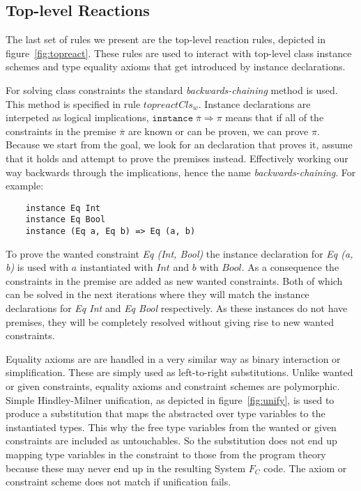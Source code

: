 \subsection{Top-level Reactions}
The last set of rules we present are the top-level reaction rules, depicted
in figure~\ref{fig:topreact}. These rules are used to interact with top-level
class instance schemes and type equality axioms that get introduced by instance
declarations.

For solving class constraints the standard \textit{backwards-chaining} method is
used. This method is specified in rule $topreactCls_w$. Instance declarations
are interpeted as logical implications, $\texttt{instance} \; \overline{\pi}
\Rightarrow \pi$ means that if all of the constraints in the premise
$\overline{\pi}$ are known or can be proven, we can prove $\pi$. Because we
start from the goal, we look for an declaration that proves it, assume that it
holds and attempt to prove the premises instead. Effectively working our way
backwards through the implications, hence the name \textit{backwards-chaining}.
For example:
\begin{verbatim}
    instance Eq Int
    instance Eq Bool
    instance (Eq a, Eq b) => Eq (a, b)
\end{verbatim}
To prove the wanted constraint \textit{Eq (Int, Bool)} the instance declaration
for \textit{Eq (a, b)} is used with $a$ instantiated with $Int$ and $b$ with
$Bool$. As a consequence the constraints in the premise are added as new wanted
constraints. Both of which can be solved in the next iterations where they will
match the instance declarations for \textit{Eq Int} and \textit{Eq Bool}
respectively. As these instances do not have premises, they will be completely
resolved without giving rise to new wanted constraints.

Equality axioms are are handled in a very similar way as binary interaction or
simplification. These are simply used as left-to-right substitutions. Unlike
wanted or given constraints, equality axioms and constraint schemes are
polymorphic. Simple Hindley-Milner unification, as depicted in
figure~\ref{fig:unify}, is used to produce a substitution that maps the
abstracted over type variables to the instantiated types. This why the free type
variables from the wanted or given constraints are included as untouchables. So
the substitution does not end up mapping type variables in the constraint to
those from the program theory because these may never end up in the resulting
System $F_C$ code. The axiom or constraint scheme does not match if
unification fails.

